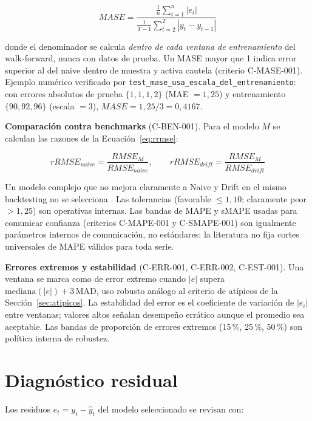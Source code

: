 \documentclass[12pt]{article}
\begin{document}
\begin{equation}
MASE = \frac{\frac{1}{n}\sum_{i=1}^{n}|e_i|}{\frac{1}{T-1}\sum_{t=2}^{T}|y_t - y_{t-1}|}
\label{eq:mase}
\end{equation}

donde el denominador se calcula \emph{dentro de cada ventana de entrenamiento} del walk-forward, nunca con datos de prueba. Un MASE mayor que 1 indica error superior al del naive dentro de muestra y activa cautela (criterio C-MASE-001). Ejemplo num\'erico verificado por \texttt{test\_mase\_usa\_escala\_del\_entrenamiento}: con errores absolutos de prueba $\{1,1,1,2\}$ (MAE $=1{,}25$) y entrenamiento $\{90,92,96\}$ (escala $=3$), $MASE = 1{,}25/3 = 0{,}4167$.

\textbf{Comparaci\'on contra benchmarks} (C-BEN-001). Para el modelo $M$ se calculan las razones de la Ecuaci\'on~\ref{eq:rrmse}:

\begin{equation}
rRMSE_{naive} = \frac{RMSE_M}{RMSE_{naive}}, \qquad rRMSE_{drift} = \frac{RMSE_M}{RMSE_{drift}}
\label{eq:rrmse}
\end{equation}

Un modelo complejo que no mejora claramente a Naive y Drift en el mismo backtesting no se selecciona \citep{hyndman2021fpp3}. Las tolerancias (favorable $\leq 1{,}10$; claramente peor $> 1{,}25$) son operativas internas. Las bandas de MAPE y sMAPE usadas para comunicar confianza (criterios C-MAPE-001 y C-SMAPE-001) son igualmente par\'ametros internos de comunicaci\'on, no est\'andares: la literatura no fija cortes universales de MAPE v\'alidos para toda serie.

\textbf{Errores extremos y estabilidad} (C-ERR-001, C-ERR-002, C-EST-001). Una ventana se marca como de error extremo cuando $|e|$ supera $\mathrm{mediana}(|e|) + 3\,\mathrm{MAD}$, uso robusto an\'alogo al criterio de at\'ipicos de la Secci\'on~\ref{sec:atipicos}. La estabilidad del error es el coeficiente de variaci\'on de $|e_i|$ entre ventanas; valores altos se\~nalan desempe\~no err\'atico aunque el promedio sea aceptable. Las bandas de proporci\'on de errores extremos (15\,\%, 25\,\%, 50\,\%) son pol\'itica interna de robustez.

\section{Diagn\'ostico residual}
\label{sec:residuos}

Los residuos $e_t = y_t - \hat{y}_t$ del modelo seleccionado se revisan con:
\end{document}
